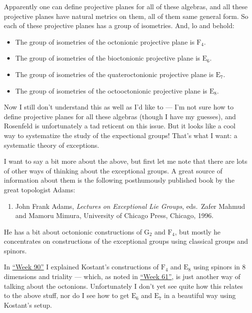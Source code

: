 \documentclass{article}
\def\tightlist{}
\begin{document}
Apparently one can define projective planes for all of these algebras,
and all these projective planes have natural metrics on them, all of
them same general form. So each of these projective planes has a group
of isometries. And, lo and behold:

\begin{itemize}
\tightlist
\item
  The group of isometries of the octonionic projective plane is
  \(\mathrm{F}_4\).
\item
  The group of isometries of the bioctonionic projective plane is
  \(\mathrm{E}_6\).
\item
  The group of isometries of the quateroctonionic projective plane is
  \(\mathrm{E}_7\).
\item
  The group of isometries of the octooctonionic projective plane is
  \(\mathrm{E}_8\).
\end{itemize}

Now I still don't understand this as well as I'd like to --- I'm not
sure how to define projective planes for all these algebras (though I
have my guesses), and Rosenfeld is unfortunately a tad reticent on this
issue. But it looks like a cool way to systematize the study of the
expectional groups! That's what I want: a systematic theory of
exceptions.

I want to say a bit more about the above, but first let me note that
there are lots of other ways of thinking about the exceptional groups. A
great source of information about them is the following posthumously
published book by the great topologist Adams:

\begin{enumerate}
\def\labelenumi{\arabic{enumi})}
\setcounter{enumi}{1}
\tightlist
\item
  John Frank Adams, \emph{Lectures on Exceptional Lie Groups},
  eds.~Zafer Mahmud and Mamoru Mimura, University of Chicago Press,
  Chicago, 1996.
\end{enumerate}

He has a bit about octonionic constructions of \(\mathrm{G}_2\) and
\(\mathrm{F}_4\), but mostly he concentrates on constructions of the
exceptional groups using classical groups and spinors.

In \protect\hyperlink{week90}{``Week 90''} I explained Kostant's
constructions of \(\mathrm{F}_4\) and \(\mathrm{E}_8\) using spinors in
8 dimensions and triality --- which, as noted in
\protect\hyperlink{week61}{``Week 61''}, is just another way of talking
about the octonions. Unfortunately I don't yet see quite how this
relates to the above stuff, nor do I see how to get \(\mathrm{E}_6\) and
\(\mathrm{E}_7\) in a beautiful way using Kostant's setup.
\end{document}
